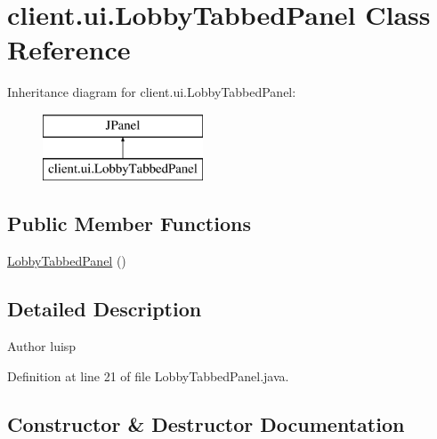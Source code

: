 \hypertarget{classclient_1_1ui_1_1_lobby_tabbed_panel}{}\section{client.\+ui.\+Lobby\+Tabbed\+Panel Class Reference}
\label{classclient_1_1ui_1_1_lobby_tabbed_panel}
Inheritance diagram for client.\+ui.\+Lobby\+Tabbed\+Panel\+:\begin{figure}[H]
\begin{center}
\leavevmode
\includegraphics[height=2.000000cm]{classclient_1_1ui_1_1_lobby_tabbed_panel}
\end{center}
\end{figure}
\subsection*{Public Member Functions}
\begin{DoxyCompactItemize}
\item 
\hyperlink{classclient_1_1ui_1_1_lobby_tabbed_panel_ace5183afecd36f1f1cc30483249ee952}{Lobby\+Tabbed\+Panel} ()
\end{DoxyCompactItemize}


\subsection{Detailed Description}
\begin{DoxyAuthor}{Author}
luisp 
\end{DoxyAuthor}


Definition at line 21 of file Lobby\+Tabbed\+Panel.\+java.



\subsection{Constructor \& Destructor Documentation}
\hypertarget{classclient_1_1ui_1_1_lobby_tabbed_panel_ace5183afecd36f1f1cc30483249ee952}{}\label{classclient_1_1ui_1_1_lobby_tabbed_panel_ace5183afecd36f1f1cc30483249ee952} 
